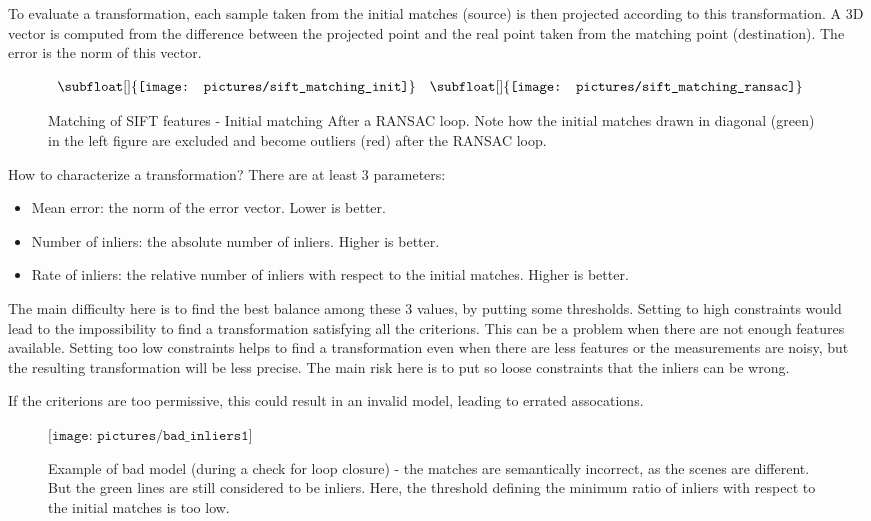To evaluate a transformation, each sample taken from the initial matches (source) is then projected according to this transformation. A 3D vector is computed from the difference between the projected point and the real point taken from the matching point (destination). The error is the norm of this vector.

\begin{figure}[h!]
\centering$
\begin{array}{cc}
\subfloat[]{\label{fig:sift_match_1} \texttt{[image: pictures/sift\_matching\_init]}} &
\subfloat[]{\label{fig:sift_match_2} \texttt{[image: pictures/sift\_matching\_ransac]}}
\end{array}$
\caption{Matching of SIFT features -  Initial matching  After a RANSAC loop. Note how the initial matches drawn in diagonal (green) in the left figure are excluded and become outliers (red) after the RANSAC loop.}
\end{figure}

How to characterize a transformation? There are at least 3 parameters:
\begin{itemize}
\item Mean error: the norm of the error vector. Lower is better.
\item Number of inliers: the absolute number of inliers. Higher is better.
\item Rate of inliers: the relative number of inliers with respect to the initial matches. Higher is better.
\end{itemize}

The main difficulty here is to find the best balance among these 3 values, by putting some thresholds. Setting to high constraints would lead to the impossibility to find a transformation satisfying all the criterions. This can be a problem when there are not enough features available. Setting too low constraints helps to find a transformation even when there are less features or the measurements are noisy, but the resulting transformation will be less precise. The main risk here is to put so loose constraints that the inliers can be wrong.

If the criterions are too permissive, this could result in an invalid model, leading to errated assocations. 

\begin{figure}[h!]
\centering$
\texttt{[image: pictures/bad\_inliers1]}$
\caption{Example of bad model (during a check for loop closure) - the matches are semantically incorrect, as the scenes are different. But the green lines are still considered to be inliers. Here, the threshold defining the minimum ratio of inliers with respect to the initial matches is too low.}
\end{figure}

